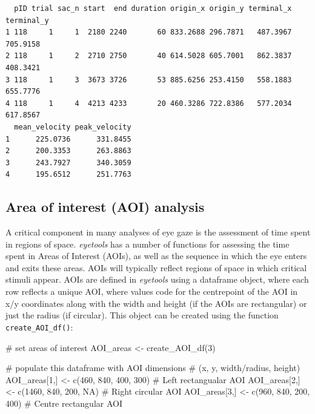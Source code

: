 \documentclass[
  man,
  floatsintext,
  longtable,
  nolmodern,
  notxfonts,
  notimes,
  colorlinks=true,linkcolor=blue,citecolor=blue,urlcolor=blue]{apa7}
\newenvironment{Shaded}{\begin{snugshade}}{\end{snugshade}}
\newcommand{\CommentTok}[1]{\textcolor[rgb]{0.37,0.37,0.37}{#1}}
\newcommand{\ConstantTok}[1]{\textcolor[rgb]{0.56,0.35,0.01}{#1}}
\newcommand{\DecValTok}[1]{\textcolor[rgb]{0.68,0.00,0.00}{#1}}
\newcommand{\FunctionTok}[1]{\textcolor[rgb]{0.28,0.35,0.67}{#1}}
\newcommand{\NormalTok}[1]{\textcolor[rgb]{0.00,0.23,0.31}{#1}}
\newcommand{\OtherTok}[1]{\textcolor[rgb]{0.00,0.23,0.31}{#1}}
\begin{document}
\begin{verbatim}
  pID trial sac_n start  end duration origin_x origin_y terminal_x terminal_y
1 118     1     1  2180 2240       60 833.2688 296.7871   487.3967   705.9158
2 118     1     2  2710 2750       40 614.5028 605.7001   862.3837   408.3421
3 118     1     3  3673 3726       53 885.6256 253.4150   558.1883   655.7776
4 118     1     4  4213 4233       20 460.3286 722.8386   577.2034   617.8567
  mean_velocity peak_velocity
1      225.0736      331.8455
2      200.3353      263.8863
3      243.7927      340.3059
4      195.6512      251.7763
\end{verbatim}

\subsection{Area of interest (AOI)
analysis}\label{area-of-interest-aoi-analysis}

A critical component in many analyses of eye gaze is the assessment of
time spent in regions of space. \emph{eyetools} has a number of
functions for assessing the time spent in Areas of Interest (AOIs), as
well as the sequence in which the eye enters and exits these areas. AOIs
will typically reflect regions of space in which critical stimuli
appear. AOIs are defined in \emph{eyetools} using a dataframe object,
where each row reflects a unique AOI, where values code for the
centrepoint of the AOI in x/y coordinates along with the width and
height (if the AOIs are rectangular) or just the radius (if circular).
This object can be created using the function
\texttt{create\_AOI\_df()}:

\begin{Shaded}
\begin{Highlighting}[]
\CommentTok{\# set areas of interest}
\NormalTok{AOI\_areas }\OtherTok{\textless{}{-}} \FunctionTok{create\_AOI\_df}\NormalTok{(}\DecValTok{3}\NormalTok{)}

\CommentTok{\# populate this dataframe with AOI dimensions }
\CommentTok{\# (x, y, width/radius, height)}
\NormalTok{AOI\_areas[}\DecValTok{1}\NormalTok{,] }\OtherTok{\textless{}{-}} \FunctionTok{c}\NormalTok{(}\DecValTok{460}\NormalTok{, }\DecValTok{840}\NormalTok{, }\DecValTok{400}\NormalTok{, }\DecValTok{300}\NormalTok{) }\CommentTok{\# Left rectangualar AOI}
\NormalTok{AOI\_areas[}\DecValTok{2}\NormalTok{,] }\OtherTok{\textless{}{-}} \FunctionTok{c}\NormalTok{(}\DecValTok{1460}\NormalTok{, }\DecValTok{840}\NormalTok{, }\DecValTok{200}\NormalTok{, }\ConstantTok{NA}\NormalTok{) }\CommentTok{\# Right circular AOI}
\NormalTok{AOI\_areas[}\DecValTok{3}\NormalTok{,] }\OtherTok{\textless{}{-}} \FunctionTok{c}\NormalTok{(}\DecValTok{960}\NormalTok{, }\DecValTok{840}\NormalTok{, }\DecValTok{200}\NormalTok{, }\DecValTok{400}\NormalTok{) }\CommentTok{\# Centre rectangular AOI}
\end{Highlighting}
\end{Shaded}
\end{document}
